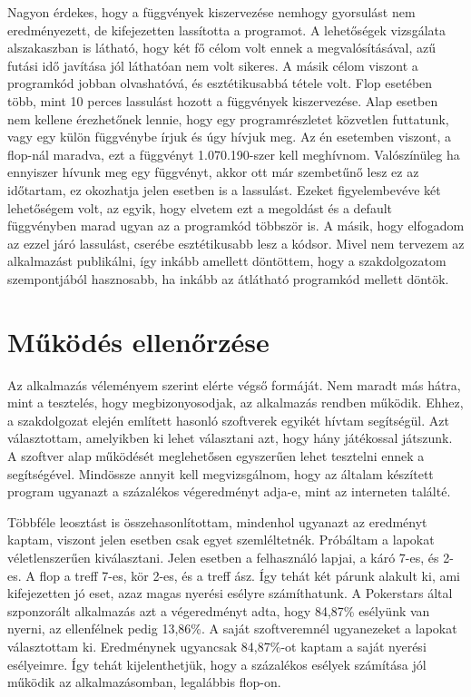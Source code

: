 Nagyon érdekes, hogy a függvények kiszervezése nemhogy gyorsulást nem eredményezett, de kifejezetten lassította a programot. A lehetőségek vizsgálata alszakaszban is látható, hogy két fő célom volt ennek a megvalósításával, azű futási idő javítása jól láthatóan nem volt sikeres. A másik célom viszont a programkód jobban olvashatóvá, és esztétikusabbá tétele volt. Flop esetében több, mint 10 perces lassulást hozott a függvények kiszervezése. Alap esetben nem kellene érezhetőnek lennie, hogy egy programrészletet közvetlen futtatunk, vagy egy külön függvénybe írjuk és úgy hívjuk meg. Az én esetemben viszont, a flop-nál maradva, ezt a függvényt 1.070.190-szer kell meghívnom. Valószínüleg ha ennyiszer hívunk meg egy függvényt, akkor ott már szembetűnő lesz ez az időtartam, ez okozhatja jelen esetben is a lassulást. Ezeket figyelembevéve két lehetőségem volt, az egyik, hogy elvetem ezt a megoldást és a default függvényben marad ugyan az a programkód többször is. A másik, hogy elfogadom az ezzel járó lassulást, cserébe esztétikusabb lesz a kódsor. Mivel nem tervezem az alkalmazást publikálni, így inkább amellett döntöttem, hogy a szakdolgozatom szempontjából hasznosabb, ha inkább az átlátható programkód mellett döntök.

\section{Működés ellenőrzése}
Az alkalmazás véleményem szerint elérte végső formáját. Nem maradt más hátra, mint a tesztelés, hogy megbizonyosodjak, az alkalmazás rendben működik. Ehhez, a szakdolgozat elején említett hasonló szoftverek egyikét hívtam segítségül. Azt választottam, amelyikben ki lehet választani azt, hogy hány játékossal játszunk. A szoftver alap működését meglehetősen egyszerűen lehet tesztelni ennek a segítségével. Mindössze annyit kell megvizsgálnom, hogy az általam készített program ugyanazt a százalékos végeredményt adja-e, mint az interneten találté.

Többféle leosztást is összehasonlítottam, mindenhol ugyanazt az eredményt kaptam, viszont jelen esetben csak egyet szemléltetnék. Próbáltam a lapokat véletlenszerűen kiválasztani. Jelen esetben a felhasználó lapjai, a káró 7-es, és 2-es. A flop a treff 7-es, kör 2-es, és a treff ász. Így tehát két párunk alakult ki, ami kifejezetten jó eset, azaz magas nyerési esélyre számíthatunk. A Pokerstars által szponzorált alkalmazás azt a végeredményt adta, hogy 84,87\% esélyünk van nyerni, az ellenfélnek pedig 13,86\%. A saját szoftveremnél ugyanezeket a lapokat választottam ki. Eredménynek ugyancsak 84,87\%-ot kaptam a saját nyerési esélyeimre. Így tehát kijelenthetjük, hogy a százalékos esélyek számítása jól működik az alkalmazásomban, legalábbis flop-on.

